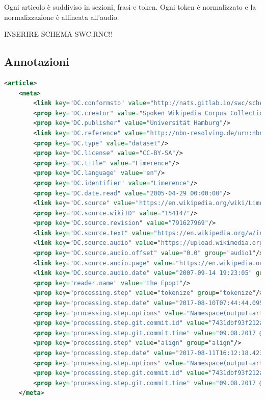 \documentclass[12pt,a4paper,titlepage]{article}
\begin{document}
Ogni articolo è suddiviso in sezioni, frasi e token. Ogni token è normalizzato e la normalizzazione è allineata all'audio.

INSERIRE SCHEMA SWC.RNC!!

\subsection{Annotazioni}
\label{subsec:annotazioni}
\begin{lstlisting}[language=XML,firstnumber=1, caption=Metadati delle annotazioni delle parole in un audio, label=metadati_annotazioni,captionpos=b]
<article>
	<meta>
		<link key="DC.conformsto" value="http://nats.gitlab.io/swc/schema/swc-1.0.rnc"/>
		<prop key="DC.creator" value="Spoken Wikipedia Corpus Collection Software"/>
		<prop key="DC.publisher" value="Universität Hamburg"/>
		<link key="DC.reference" value="http://nbn-resolving.de/urn:nbn:de:gbv:18-228-7-2209"/>
		<prop key="DC.type" value="dataset"/>
		<prop key="DC.license" value="CC-BY-SA"/>
		<prop key="DC.title" value="Limerence"/>
		<prop key="DC.language" value="en"/>
		<prop key="DC.identifier" value="Limerence"/>
		<prop key="DC.date.read" value="2005-04-29 00:00:00"/>
		<link key="DC.source" value="https://en.wikipedia.org/wiki/Limerence"/>
		<prop key="DC.source.wikiID" value="154147"/>
		<prop key="DC.source.revision" value="791627969"/>
		<link key="DC.source.text" value="https://en.wikipedia.org/w/index.php?title=Limerence&oldid=13811989"/>
		<link key="DC.source.audio" value="https://upload.wikimedia.org/wikipedia/commons/a/aa/Limerence.ogg" group="audio1"/>
		<prop key="DC.source.audio.offset" value="0.0" group="audio1"/>
		<link key="DC.source.audio.page" value="https://en.wikipedia.org/w/index.php?title=File%3aLimerence.ogg" group="audio1"/>
		<link key="DC.source.audio.date" value="2007-09-14 19:23:05" group="audio1"/>
		<prop key="reader.name" value="the Epopt"/>
		<prop key="processing.step" value="tokenize" group="tokenize"/>
		<prop key="processing.step.date" value="2017-08-10T07:44:44.095+02:00[Europe/Berlin]" group="tokenize"/>
		<prop key="processing.step.options" value="Namespace(output=articles/Limerence/tokenized.swc, all_sections=false, null_normalize=false, raw_output=null, subparser_name=tokenize, lang=en, no_introduction=false, article_dir=articles/Limerence)" group="tokenize"/>
		<prop key="processing.step.git.commit.id" value="7431dbf93f212ad828208abaf8f518fb8de11ff3" group="tokenize"/>
		<prop key="processing.step.git.commit.time" value="09.08.2017 @ 15:21:55 CEST" group="tokenize"/>
		<prop key="processing.step" value="align" group="align"/>
		<prop key="processing.step.date" value="2017-08-11T16:12:18.423+02:00[Europe/Berlin]" group="align"/>
		<prop key="processing.step.options" value="Namespace(output=articles/Limerence/aligned.swc, transcript=articles/Limerence/tokenized.swc, g2p=../model_en/model.fst.ser, phone=false, subparser_name=align, dict=../model_en/empty.dic, acoustic_model=../model_en/, audio=articles/Limerence/audio.wav)" group="align"/>
		<prop key="processing.step.git.commit.id" value="7431dbf93f212ad828208abaf8f518fb8de11ff3" group="align"/>
		<prop key="processing.step.git.commit.time" value="09.08.2017 @ 15:21:55 CEST" group="align"/>
	</meta>
\end{lstlisting}
\end{document}
